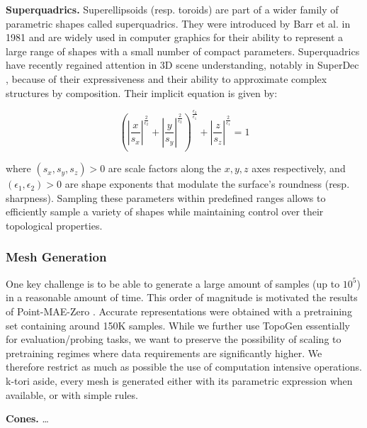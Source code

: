 \textbf{Superquadrics.} Superellipsoids  (resp. toroids) are part of a wider family of parametric shapes called superquadrics. They were introduced by Barr et al. \cite{superquadrics} in 1981 and are widely used in computer graphics for their ability to represent a large range of shapes with a small number of compact parameters. Superquadrics have recently regained attention in 3D scene understanding, notably in SuperDec \cite{superdec}, because of their expressiveness and their ability to approximate complex structures by composition. Their implicit equation is given by:

\begin{equation}
\left( \left| \frac{x}{s_x} \right|^{\tfrac{2}{\epsilon_2}}
     + \left| \frac{y}{s_y} \right|^{\tfrac{2}{\epsilon_2}} \right)^{\tfrac{\epsilon_2}{\epsilon_1}}
+ \left| \frac{z}{s_z} \right|^{\tfrac{2}{\epsilon_1}}
= 1
\end{equation}

where $(s_x, s_y, s_z) > 0$ are scale factors along the $x, y, z$ axes respectively, and $(\epsilon_1, \epsilon_2) > 0$ are shape exponents that modulate the surface's roundness (resp. sharpness). Sampling these parameters within predefined ranges allows to efficiently sample a variety of shapes while maintaining control over their topological properties.

\subsubsection{Mesh Generation}
\label{sssec:mesh-generation}

One key challenge is to be able to generate a large amount of samples (up to $10^5$) in a reasonable amount of time. This order of magnitude is motivated the results of Point-MAE-Zero \cite{pmaezero}. Accurate representations were obtained with a pretraining set containing around 150K samples. While we further use TopoGen essentially for evaluation/probing tasks, we want to preserve the possibility of scaling to pretraining regimes where data requirements are significantly higher. We therefore restrict as much as possible the use of computation intensive operations. k-tori aside, every mesh is generated either with its parametric expression when available, or with simple rules.

\textbf{Cones.} \dots

